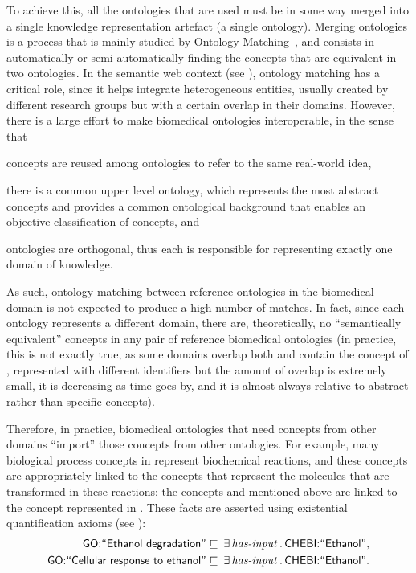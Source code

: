 To achieve this, all the ontologies that are used must be in some way merged into a single knowledge representation artefact (a single ontology). Merging ontologies is a process that is mainly studied by Ontology Matching~\citep{Shvaiko2005,Euzenat2007}, and consists in automatically or semi-automatically finding the concepts that are equivalent in two ontologies. In the semantic web context (see ), ontology matching has a critical role, since it helps integrate heterogeneous entities, usually created by different research groups but with a certain overlap in their domains. However, there is a large effort to make biomedical ontologies interoperable, in the sense that
\begin{paralist}
    \item concepts are reused among ontologies to refer to the same real-world idea,
    \item there is a common upper level ontology, which represents the most abstract concepts and provides a common ontological background that enables an objective classification of concepts, and
    \item ontologies are orthogonal, thus each is responsible for representing exactly one domain of knowledge.
\end{paralist}
As such, ontology matching between reference ontologies in the biomedical domain is not expected to produce a high number of matches. In fact, since each ontology represents a different domain, there are, theoretically, no ``semantically equivalent'' concepts in any pair of reference biomedical ontologies (in practice, this is not exactly true, as some domains overlap \mdash \eg both  and  contain the concept of , represented with different identifiers \mdash but the amount of overlap is extremely small, it is decreasing as time goes by, and it is almost always relative to abstract rather than specific concepts).

Therefore, in practice, biomedical ontologies that need concepts from other domains ``import'' those concepts from other ontologies. For example, many biological process concepts in  represent biochemical reactions, and these concepts are appropriately linked to the  concepts that represent the molecules that are transformed in these reactions: \eg the concepts  and  mentioned above are linked to the concept  represented in . These facts are asserted using existential quantification axioms (see ):
\begin{align*}
    \term{GO:``Ethanol degradation''} &
        \sqsubseteq\:\exists\,\prop{has-input}\,.\,\term{CHEBI:``Ethanol''}, \\
    \term{GO:``Cellular response to ethanol''} &
        \sqsubseteq\:\exists\,\prop{has-input}\,.\,\term{CHEBI:``Ethanol''}.
\end{align*}

